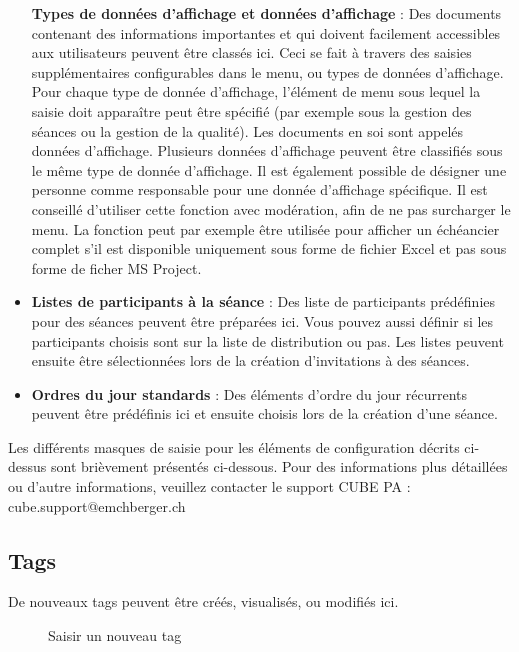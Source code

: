 \begin{itemize}
\textbf{Types de données d'affichage et données d'affichage} : Des documents contenant des informations importantes et qui doivent facilement accessibles aux utilisateurs peuvent être classés ici. Ceci se fait à travers des saisies supplémentaires configurables dans le menu, ou types de données d'affichage. Pour chaque type de donnée d'affichage, l'élément de menu sous lequel la saisie doit apparaître peut être spécifié (par exemple sous la gestion des séances ou la gestion de la qualité). Les documents en soi sont appelés données d'affichage. Plusieurs données d'affichage peuvent être classifiés sous le même type de donnée d'affichage. Il est également possible de désigner une personne comme responsable pour une donnée d'affichage spécifique. Il est conseillé d'utiliser cette fonction avec modération, afin de ne pas surcharger le menu. La fonction peut par exemple être utilisée pour afficher un échéancier complet s'il est disponible uniquement sous forme de fichier Excel et pas sous forme de ficher MS Project.
\item
\textbf{Listes de participants à la séance} : Des liste de participants prédéfinies pour des séances peuvent être préparées ici. Vous pouvez aussi définir si les participants choisis sont sur la liste de distribution ou pas. Les listes peuvent ensuite être sélectionnées lors de la création d'invitations à des séances.
\item
\textbf{Ordres du jour standards} : Des éléments d'ordre du jour récurrents peuvent être prédéfinis ici et ensuite choisis lors de la création d'une séance.
\end{itemize}

\vspace{\baselineskip}

Les différents masques de saisie pour les éléments de configuration décrits ci-dessus sont brièvement présentés ci-dessous. Pour des informations plus détaillées ou d'autre informations, veuillez contacter le support CUBE PA : {\color{red} cube.support@emchberger.ch}

\subsection{Tags}

De nouveaux tags peuvent être créés, visualisés, ou modifiés ici.

\begin{figure}[H]
\caption{Saisir un nouveau tag}
\end{figure}

